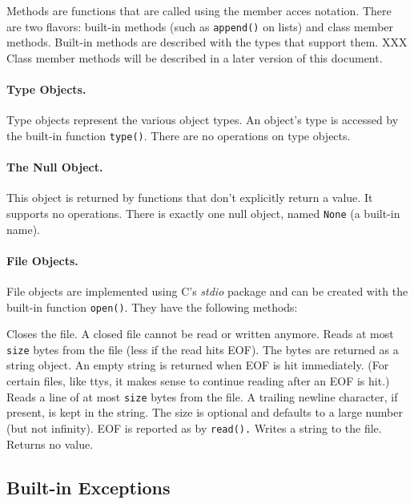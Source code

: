Methods are functions that are called using the member acces notation.
There are two flavors: built-in methods (such as {\tt append()} on
lists) and class member methods.
Built-in methods are described with the types that support them.
XXX Class member methods will be described in a later version of this
document.

\paragraph{Type Objects.}

Type objects represent the various object types.
An object's type is accessed by the built-in function
{\tt type()}.
There are no operations on type objects.

\paragraph{The Null Object.}

This object is returned by functions that don't explicitly return a
value.
It supports no operations.
There is exactly one null object, named {\tt None}
(a built-in name).

\paragraph{File Objects.}

File objects are implemented using C's
{\em stdio}
package and can be created with the built-in function
{\tt open()}.
They have the following methods:
\begin{description}
Closes the file.
A closed file cannot be read or written anymore.
Reads at most
{\tt size}
bytes from the file (less if the read hits EOF).
The bytes are returned as a string object.
An empty string is returned when EOF is hit immediately.
(For certain files, like ttys, it makes sense to continue reading after
an EOF is hit.)
Reads a line of at most
{\tt size}
bytes from the file.
A trailing newline character, if present, is kept in the string.
The size is optional and defaults to a large number (but not infinity).
EOF is reported as by
{\tt read().}
Writes a string to the file.
Returns no value.
\end{description}

\subsection{Built-in Exceptions}

